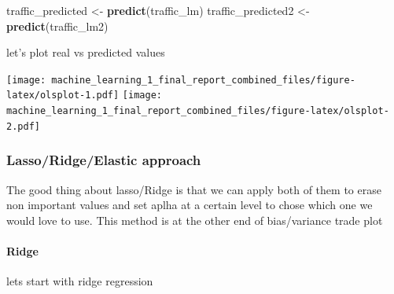 \documentclass[
]{article}
\newenvironment{Shaded}{\begin{snugshade}}{\end{snugshade}}
\newcommand{\CommentTok}[1]{\textcolor[rgb]{0.56,0.35,0.01}{\textit{#1}}}
\newcommand{\DataTypeTok}[1]{\textcolor[rgb]{0.13,0.29,0.53}{#1}}
\newcommand{\DecValTok}[1]{\textcolor[rgb]{0.00,0.00,0.81}{#1}}
\newcommand{\FloatTok}[1]{\textcolor[rgb]{0.00,0.00,0.81}{#1}}
\newcommand{\KeywordTok}[1]{\textcolor[rgb]{0.13,0.29,0.53}{\textbf{#1}}}
\newcommand{\NormalTok}[1]{#1}
\newcommand{\OperatorTok}[1]{\textcolor[rgb]{0.81,0.36,0.00}{\textbf{#1}}}
\newcommand{\StringTok}[1]{\textcolor[rgb]{0.31,0.60,0.02}{#1}}
\begin{document}
\begin{Shaded}
\begin{Highlighting}[]
\NormalTok{traffic_predicted <-}\StringTok{ }\KeywordTok{predict}\NormalTok{(traffic_lm)}
\NormalTok{traffic_predicted2 <-}\StringTok{ }\KeywordTok{predict}\NormalTok{(traffic_lm2)}
\end{Highlighting}
\end{Shaded}

let's plot real vs predicted values

\texttt{[image: machine\_learning\_1\_final\_report\_combined\_files/figure-latex/olsplot-1.pdf]}
\texttt{[image: machine\_learning\_1\_final\_report\_combined\_files/figure-latex/olsplot-2.pdf]}

\hypertarget{lassoridgeelastic-approach}{%
\subsubsection{Lasso/Ridge/Elastic
approach}\label{lassoridgeelastic-approach}}

The good thing about lasso/Ridge is that we can apply both of them to
erase non important values and set aplha at a certain level to chose
which one we would love to use. This method is at the other end of
bias/variance trade plot

\hypertarget{ridge}{%
\paragraph{Ridge}\label{ridge}}

lets start with ridge regression

\begin{Shaded}
\end{Shaded}
\end{document}
